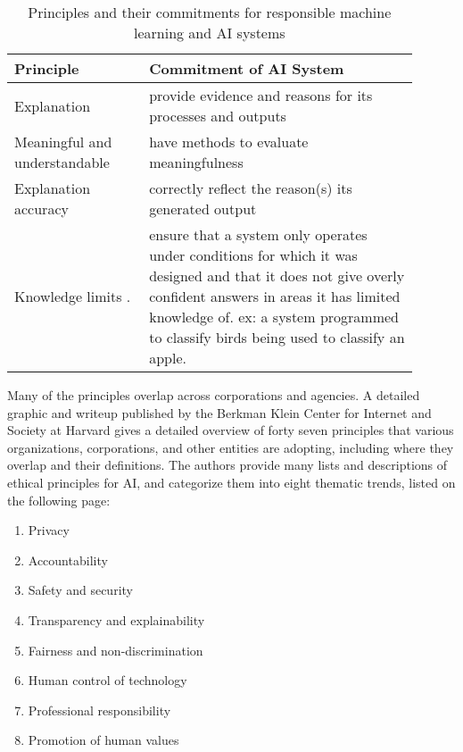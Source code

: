 \documentclass{svproc}
\begin{document}
\begin{table}
  \caption{{Principles and their commitments for responsible 
machine learning and AI systems} \cite{Phillips2021FourIntelligence}}
  \label{tab:princ}
  \begin{tabular}{p{0.30\linewidth} p{0.6\linewidth}}
    \hline
   Principle& Commitment of AI System\\
    \hline
    Explanation  &     provide evidence and reasons for its processes and outputs\\\hline
     Meaningful and understandable  &    have methods to evaluate meaningfulness\\\hline
    Explanation accuracy  &   correctly reflect the reason(s) its generated output\\\hline
    Knowledge limits .  & ensure that a system only operates under conditions for which it was designed and that it does not give overly confident answers in areas it has limited knowledge of. ex: a system programmed to classify birds being used to classify an apple.\\

  \hline
\end{tabular}
\end{table}



Many of the principles overlap across corporations and agencies. A detailed graphic and writeup published by the Berkman Klein Center for Internet and Society at Harvard gives a detailed overview of  forty seven principles that various organizations, corporations, and other entities are adopting, including where they overlap and their definitions. The authors provide many lists and descriptions of ethical principles for AI, and categorize them into eight thematic trends, listed on the following page: 

\begin{enumerate}
    \item Privacy
    \item Accountability
    \item Safety and security
    \item Transparency and explainability
    \item Fairness and non-discrimination
    \item Human control of technology
    \item Professional responsibility
    \item Promotion of human values \cite{Fjeld2020PrincipledAI}
    \end{enumerate}
\end{document}
